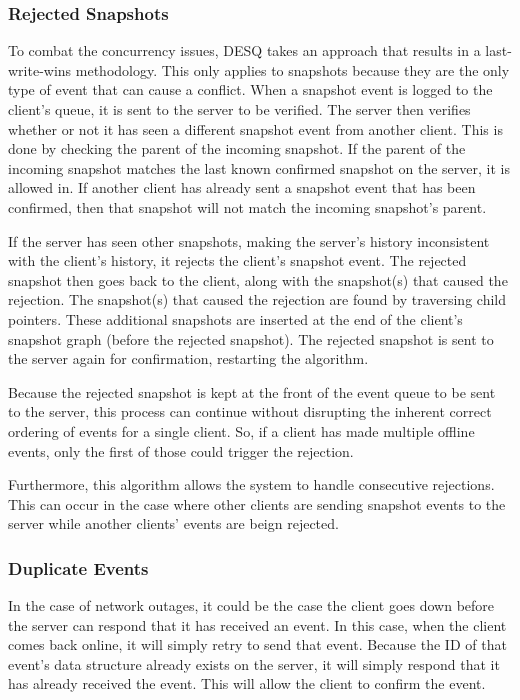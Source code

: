\subsubsection{Rejected Snapshots}

To combat the concurrency issues, DESQ takes an approach that results in a last-write-wins methodology. This only applies to snapshots because they are the only type of event that can cause a conflict. When a snapshot event is logged to the client's queue, it is sent to the server to be verified. The server then verifies whether or not it has seen a different snapshot event from another client. This is done by checking the parent of the incoming snapshot. If the parent of the incoming snapshot matches the last known confirmed snapshot on the server, it is allowed in. If another client has already sent a snapshot event that has been confirmed, then that snapshot will not match the incoming snapshot's parent.

If the server has seen other snapshots, making the server's history inconsistent with the client's history, it rejects the client's snapshot event. The rejected snapshot then goes back to the client, along with the snapshot(s) that caused the rejection. The snapshot(s) that caused the rejection are found by traversing child pointers. These additional snapshots are inserted at the end of the client's snapshot graph (before the rejected snapshot). The rejected snapshot is sent to the server again for confirmation, restarting the algorithm. 

Because the rejected snapshot is kept at the front of the event queue to be sent to the server, this process can continue without disrupting the inherent correct ordering of events for a single client. So, if a client has made multiple offline events, only the first of those could trigger the rejection.

Furthermore, this algorithm allows the system to handle consecutive rejections. This can occur in the case where other clients are sending snapshot events to the server while another clients' events are beign rejected.

\subsubsection{Duplicate Events}

In the case of network outages, it could be the case the client goes down before the server can respond that it has received an event. In this case, when the client comes back online, it will simply retry to send that event. Because the ID of that event's data structure already exists on the server, it will simply respond that it has already received the event. This will allow the client to confirm the event.